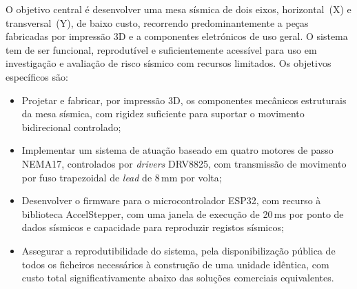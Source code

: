 O objetivo central é desenvolver uma mesa sísmica de dois eixos, horizontal~(X) e transversal~(Y), de baixo custo, recorrendo predominantemente a peças fabricadas por impressão 3D e a componentes eletrónicos de uso geral. O sistema tem de ser funcional, reprodutível e suficientemente acessível para uso em investigação e avaliação de risco sísmico com recursos limitados. Os objetivos específicos são:

\begin{itemize}
    \item Projetar e fabricar, por impressão 3D, os componentes mecânicos estruturais da mesa sísmica, com rigidez suficiente para suportar o movimento bidirecional controlado;
    \item Implementar um sistema de atuação baseado em quatro motores de passo NEMA17, controlados por \textit{drivers} DRV8825, com transmissão de movimento por fuso trapezoidal de \textit{lead} de 8\,mm por volta;
    \item Desenvolver o firmware para o microcontrolador ESP32, com recurso à biblioteca AccelStepper, com uma janela de execução de 20\,ms por ponto de dados sísmicos e capacidade para reproduzir registos sísmicos;
    \item Assegurar a reprodutibilidade do sistema, pela disponibilização pública de todos os ficheiros necessários à construção de uma unidade idêntica, com custo total significativamente abaixo das soluções comerciais equivalentes.
\end{itemize}

